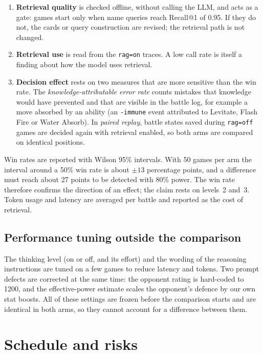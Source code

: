 \documentclass[11pt,a4paper]{article}
\newcommand{\code}[1]{\texttt{#1}}
\begin{document}
\begin{enumerate}
  \item \textbf{Retrieval quality} is checked offline, without calling the LLM, and acts as a gate: games
        start only when name queries reach Recall@1 of 0.95. If they do not, the cards or query construction
        are revised; the retrieval path is not changed.
  \item \textbf{Retrieval use} is read from the \code{rag=on} traces. A low call rate is itself a finding
        about how the model uses retrieval.
  \item \textbf{Decision effect} rests on two measures that are more sensitive than the win rate. The
        \emph{knowledge-attributable error rate} counts mistakes that knowledge would have prevented and that
        are visible in the battle log, for example a move absorbed by an ability (an \code{-immune} event
        attributed to Levitate, Flash Fire or Water Absorb). In \emph{paired replay}, battle states saved
        during \code{rag=off} games are decided again with retrieval enabled, so both arms are compared on
        identical positions.
\end{enumerate}

Win rates are reported with Wilson 95\% intervals. With 50 games per arm the interval around a 50\% win rate
is about $\pm 13$ percentage points, and a difference must reach about 27 points to be detected with 80\%
power. The win rate therefore confirms the direction of an effect; the claim rests on levels~2 and~3. Token
usage and latency are averaged per battle and reported as the cost of retrieval.

\subsection{Performance tuning outside the comparison}
\label{sec:tuning}
The thinking level (on or off, and its effort) and the wording of the reasoning instructions are tuned on a
few games to reduce latency and tokens. Two prompt defects are corrected at the same time: the opponent rating
is hard-coded to 1200, and the effective-power estimate scales the opponent's defence by our own stat boosts.
All of these settings are frozen before the comparison starts and are identical in both arms, so they
cannot account for a difference between them.

\section{Schedule and risks}
\label{sec:schedule}
\end{document}
